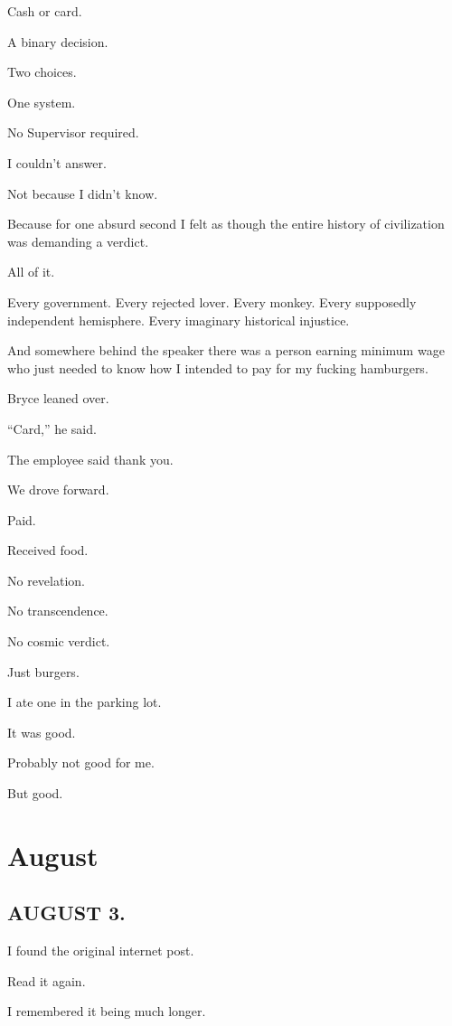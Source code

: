 \documentclass[11pt,oneside]{book}
\begin{document}
Cash or card.

A binary decision.

Two choices.

One system.

No Supervisor required.

I couldn't answer.

Not because I didn't know.

Because for one absurd second I felt as though the entire history of civilization was demanding a verdict.

All of it.

Every government. Every rejected lover. Every monkey. Every supposedly independent hemisphere. Every imaginary historical injustice.

And somewhere behind the speaker there was a person earning minimum wage who just needed to know how I intended to pay for my fucking hamburgers.

Bryce leaned over.

``Card,'' he said.

The employee said thank you.

We drove forward.

Paid.

Received food.

No revelation.

No transcendence.

No cosmic verdict.

Just burgers.

I ate one in the parking lot.

It was good.

Probably not good for me.

But good.

\chapter*{August}

\section*{AUGUST 3.}

I found the original internet post.

Read it again.

I remembered it being much longer.
\end{document}
